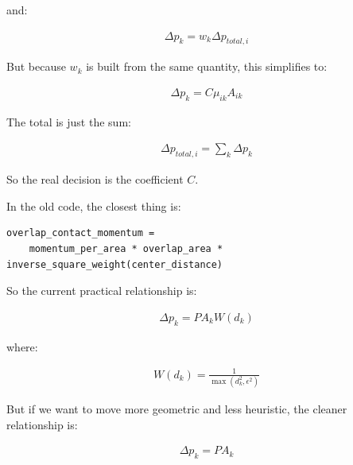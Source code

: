 and:

\begin{equation}
\begin{aligned}
\label{none}
\Delta p_k = w_k \Delta p_{total,i}
\end{aligned}
\end{equation}

But because $w_k$ is built from the same quantity, this simplifies to:


\begin{equation}
\begin{aligned}
\label{none}
\Delta p_k = C \mu_{ik} A_{ik}
\end{aligned}
\end{equation}

The total is just the sum:

\begin{equation}
\begin{aligned}
\label{none}
\Delta p_{total,i}=\sum_k \Delta p_k
\end{aligned}
\end{equation}

So the real decision is the coefficient $C$.

In the old code, the closest thing is:
\begin{verbatim}
overlap_contact_momentum =
    momentum_per_area * overlap_area * inverse_square_weight(center_distance)
\end{verbatim}
So the current practical relationship is:

\begin{equation}
\begin{aligned}
\label{none}
\Delta p_k=P A_k W(d_k)
\end{aligned}
\end{equation}

where:

\begin{equation}
\begin{aligned}
\label{none}
W(d_k) = \frac{1}{\max(d_k^2, \epsilon^2)}
\end{aligned}
\end{equation}

But if we want to move more geometric and less heuristic, the cleaner relationship is:

\begin{equation}
\begin{aligned}
\label{none}
\Delta p_k = P A_k
\end{aligned}
\end{equation}

